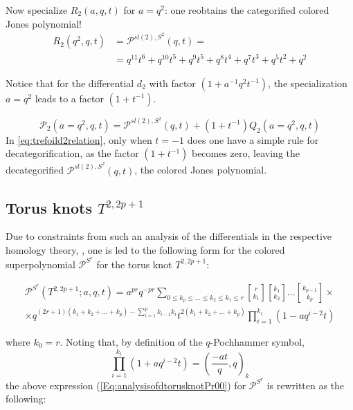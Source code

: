 \documentclass[a4paper,titlepage,twoside]{book}
\begin{document}
Now specialize $R_2{(a,q,t)}$ for $a=q^2$: one reobtains the categorified colored Jones polynomial!
\begin{equation}
\begin{aligned}
  R_2{(q^2, q, t)} & = \mathcal{P}^{ sl{(2)},S^2}{(q,t)} = \\
  & = q^{11} t^{6} + q^{10} t^{5} + q^{9} t^{5} + q^{8} t^{4} + q^{7} t^{3} + q^{5} t^{2} + q^{2}
\end{aligned}
\end{equation}

Notice that for the differential $d_2$ with factor $(1 + a^{-1}q^2 t^{-1})$, the specialization $a=q^2$ leads to a factor $(1+t^{-1})$.  

\begin{equation}
\mathcal{P}_2{(a=q^2,q,t)} = \mathcal{P}^{sl{(2)}, S^2}{(q,t)} + ( 1 + t^{-1}) Q_2{(a=q^2, q,t)} \label{eq:trefoild2relation}
\end{equation}
In \eqref{eq:trefoild2relation}, only when $t=-1$ does one have a simple rule for decategorification, as the factor $(1+t^{-1})$ becomes zero, leaving the decategorified $\mathcal{P}^{sl{(2)},S^2}{(q,t)}$, the colored Jones polynomial.   

  




\subsection{Torus knots $T^{2,2p+1}$}

Due to constraints from such an analysis of the differentials in the respective homology theory, \cite{FujiGukovStosicSulkowski2013}, one is led to the following form for the colored superpolynomial $\mathcal{P}^{S^r}$ for the torus knot $T^{2,2p+1}$:

\begin{equation}
  \begin{gathered}
    \mathcal{P}^{ S^r}{ (T^{2,2p+1};a,q,t) } = a^{pr} q^{-pr} \sum_{ 0 \leq k_p \leq \dots \leq k_2 \leq k_1 \leq r} { r \brack k_1 } { k_1 \brack k_2 } \dots { k_{p-1} \brack k_p } \times \\
    \times q^{ (2r+1)( k_1 + k_2 + \dots + k_p )  - \sum_{i=1}^p k_{i-1} k_i } t^{ 2 (k_1 + k_2 + \dots + k_p ) } \prod_{i=1}^{ k_1} ( 1 - aq^{ i- 2 } t ) 
\end{gathered} \label{Eq:analysisofdtorusknotPr00}
\end{equation}

where $k_0 =r$.  Noting that, by definition of the $q$-Pochhammer symbol, 
\[
\prod_{i=1}^{k_1} (1 + a q^{i-2} t) = \left( \frac{-at}{q}, q \right)_k
\]
the above expression (\ref{Eq:analysisofdtorusknotPr00}) for $\mathcal{P}^{S^r}$ is rewritten as the following:
\end{document}

